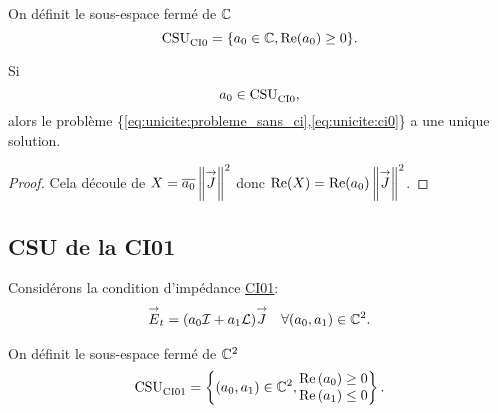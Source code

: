     \begin{defn}
      \label{def:csu:ci0}
      On définit le sous-espace fermé de \(\mathbb C\)
      \begin{equation*}
        \operatorname{CSU}_{\operatorname{CI0}}^{{}} = \lbrace a_0 \in \mathbb C, \operatorname{Re}(a_0) \ge 0 \rbrace.
      \end{equation*}
    \end{defn}

    \begin{prop}
      \label{prop:csu:ci0}
      Si
      \begin{equation*}
        a_0 \in \operatorname{CSU}_{\operatorname{CI0}}^{{}},
      \end{equation*}
      alors le problème \{\eqref{eq:unicite:probleme_sans_ci},\eqref{eq:unicite:ci0}\} a une unique solution.
    \end{prop}
    \begin{proof}
      Cela découle de \( X = {\overline{a_0}}\left\lVert{\overset{\rightarrow}{J}}\right\rVert^2\) donc \(\operatorname{Re}(X) = \operatorname{Re}(a_0)\left\lVert{\overset{\rightarrow}{J}}\right\rVert^2 \).
    \end{proof}
  \subsection{CSU de la CI01}
    Considérons la condition d’impédance \hyperlink{ci01}{CI01}:
    \begin{align}
      \label{eq:unicite:ci01}
      {\overset{\rightarrow}{E}}_t = (a_0{\mathcal{I}} + a_1 \mathcal{L}){\overset{\rightarrow}{J}} && \forall (a_0, a_1) \in \mathbb C^2.
    \end{align}

    \begin{defn}
      \label{def:csu:ci01}
      On définit le sous-espace fermé de \(\mathbb C^2\)
      \begin{equation*}
        \operatorname{CSU}_{\operatorname{CI01}}^{{}} = \left\lbrace (a_0,a_1) \in \mathbb C^2,
        \begin{matrix}
        \operatorname{Re}\left(a_0\right) \ge 0
        \\
        \operatorname{Re}\left(a_1\right) \le 0
        \end{matrix}
        \right\rbrace.
      \end{equation*}
    \end{defn}

